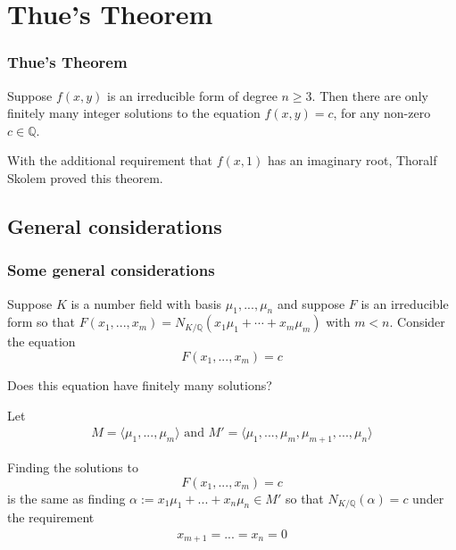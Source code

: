 \documentclass{beamer}
\newcommand{\mbb}[1]{\mathbb{#1}}
\numberwithin{equation}{section}
\begin{document}
\section{Thue's Theorem}
\begin{frame}
	\frametitle{Thue's Theorem}	
	\begin{theorem}[Thue]\label{thm: Thues theorem introduction}
		Suppose $f(x,y)$ is an irreducible form of degree $n \geq 3$. Then there are only finitely many integer solutions to the equation $f(x,y) = c$, for any non-zero $c \in \mbb{Q}$.
	\end{theorem}
	With the additional requirement that $f(x,1)$ has an imaginary root, Thoralf Skolem proved this theorem.  
\end{frame}

\subsection{General considerations}
\begin{frame}
	\frametitle{Some general considerations}
	Suppose $K$ is a number field with basis $\mu_1, ..., \mu_n$ and suppose $F$ is an irreducible form so that 
	$F(x_1, ..., x_m) = N_{K/\mbb Q}(x_1 \mu_1 + \cdots + x_m \mu_m)$ with $m < n$. Consider the equation 
	$$F(x_1, ..., x_m) = c$$ 

	Does this equation have finitely many solutions?
\end{frame}

\begin{frame}
	Let
	\begin{align*}
		M = \langle \mu_1, ..., \mu_m \rangle \text{ and } M' = \langle \mu_{1}, ..., \mu_{m}, \mu_{m+1}, ..., \mu_{n} \rangle 	
	\end{align*}
\end{frame}
\begin{frame}
	Finding the solutions to
	$$F(x_1, ..., x_m) = c$$
	is the same as finding $\alpha := x_1 \mu_1 + ... + x_n \mu_n \in M'$ so that $N_{K/\mbb Q}(\alpha) = c$ under the requirement
	\begin{align*}
		x_{m+1} = ... = x_n = 0
	\end{align*} 
\end{frame}
\end{document}
